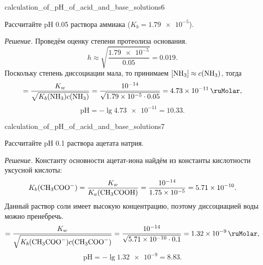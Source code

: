 \begin{example}{}{calculation_of_pH_of_acid_and_base_solutions6}
    \begin{condition}
        Рассчитайте pH \qty{0,05}{\ruMolar} раствора аммиака ($K_b = \num{1,79e-5}$).
    \end{condition}

    \medskip

    \textit{Решение.} Проведём оценку степени протеолиза основания.
    \begin{equation*}
        h \approx \sqrt{\frac{\num{1,79e-5}}{\num{0,05}}} = \num{0,019}.
    \end{equation*}
    Поскольку степень диссоциации мала, то принимаем $[\ce{NH3}] \approx c(\ce{NH3})$, тогда
    \begin{equation*}
        [\ce{H^+}] = \frac{K_w}{\sqrt{K_b(\ce{NH3})c(\ce{NH3})}} = \frac{\num{e-14}}{\sqrt{\num{1,79e-5}\cdot\num{0,05}}} = \qty{4,73e-11}{\ruMolar},
    \end{equation*}
    \begin{equation*}
        \text{pH} = -\lg\num{4,73e-11} = \num{10,33}.
    \end{equation*}
\end{example}

\begin{example}{}{calculation_of_pH_of_acid_and_base_solutions7}
    \begin{condition}
        Рассчитайте pH \qty{0,1}{\ruMolar} раствора ацетата натрия.
    \end{condition}

    \medskip

    \textit{Решение.} Константу основности ацетат-иона найдём из константы кислотности уксусной кислоты:
    \begin{equation*}
        K_b(\ce{CH3COO^-}) = \frac{K_w}{K_a(\ce{CH3COOH})} = \frac{\num{e-14}}{\num{1,75e-5}} = \num{5,71e-10}.
    \end{equation*}
    Данный раствор соли имеет высокую концентрацию, поэтому диссоциацией воды можно пренебречь.
    \begin{equation*}
        [\ce{H^+}] = \frac{K_w}{\sqrt{K_b(\ce{CH3COO^-})c(\ce{CH3COO^-})}} = \frac{\num{e-14}}{\sqrt{\num{5,71e-10}\cdot\num{0,1}}} = \qty{1,32e-9}{\ruMolar},
    \end{equation*}
    \begin{equation*}
        \text{pH} = -\lg\num{1,32e-9} = \num{8,83}.
    \end{equation*}
\end{example}


